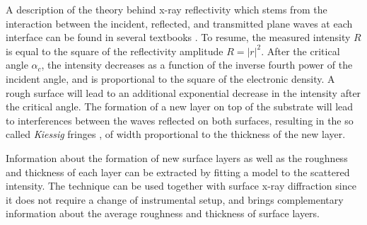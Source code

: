 A description of the theory behind x-ray reflectivity which stems from the interaction between the incident, reflected, and transmitted plane waves at each interface can be found in several textbooks \parencite{Willmott}.
To resume, the measured intensity $R$ is equal to the square of the reflectivity amplitude $R=|r|^2$.
After the critical angle $\alpha_c$, the intensity decreases as a function of the inverse fourth power of the incident angle, and is proportional to the square of the electronic density.
A rough surface will lead to an additional exponential decrease in the intensity after the critical angle.
The formation of a new layer on top of the substrate will lead to interferences between the waves reflected on both surfaces, resulting in the so called \textit{Kiessig} fringes \parencite{Kiessig1931}, of width proportional to the thickness of the new layer.

Information about the formation of new surface layers as well as the roughness and thickness of each layer can be extracted by fitting a model to the scattered intensity.
The technique can be used together with surface x-ray diffraction since it does not require a change of instrumental setup, and brings complementary information about the average roughness and thickness of surface layers.